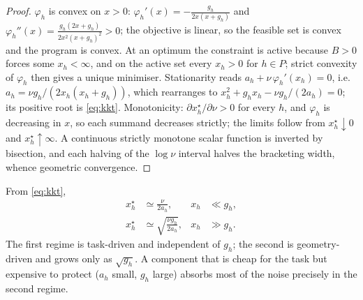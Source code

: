\begin{proof}
$\varphi_h$ is convex on $x>0$:
$\varphi_h'(x)=-\frac{g_h}{2x(x+g_h)}$ and
$\varphi_h''(x)=\frac{g_h(2x+g_h)}{2x^2(x+g_h)^2}>0$; the objective is linear,
so the feasible set is convex and the program is convex. At an optimum the
constraint is active because $B>0$ forces some $x_h<\infty$, and on the active
set every $x_h>0$ for $h\in P$; strict convexity of $\varphi_h$ then gives a
unique minimiser. Stationarity reads
$a_h+\nu\,\varphi_h'(x_h)=0$, i.e.
$a_h=\nu g_h/(2x_h(x_h+g_h))$, which rearranges to
$x_h^2+g_hx_h-\nu g_h/(2a_h)=0$; its positive root is \eqref{eq:kkt}.
Monotonicity: $\partial x_h^\star/\partial\nu>0$ for every $h$, and
$\varphi_h$ is decreasing in $x$, so each summand decreases strictly; the
limits follow from $x_h^\star\downarrow0$ and $x_h^\star\uparrow\infty$. A
continuous strictly monotone scalar function is inverted by bisection, and
each halving of the $\log\nu$ interval halves the bracketing width, whence
geometric convergence.
\end{proof}

\begin{corollary}
\label{co:asymptotics}
From \eqref{eq:kkt},
\begin{align}
x_h^\star&\simeq\frac{\nu}{2a_h}, & x_h&\ll g_h,\label{eq:asym1}\\
x_h^\star&\simeq\sqrt{\frac{\nu g_h}{2a_h}}, & x_h&\gg g_h.\label{eq:asym2}
\end{align}
The first regime is task-driven and independent of $g_h$; the second is
geometry-driven and grows only as $\sqrt{g_h}$. A component that is cheap for
the task but expensive to protect ($a_h$ small, $g_h$ large) absorbs most of
the noise precisely in the second regime.
\end{corollary}

